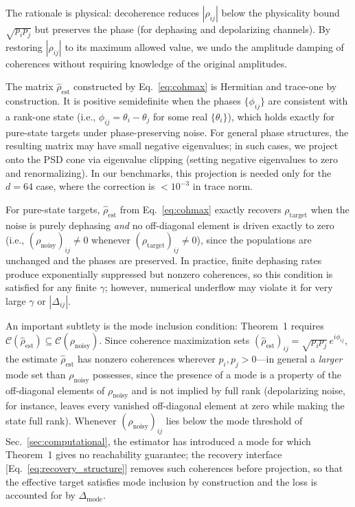 \documentclass[a4paper,onecolumn]{quantumarticle}
\newcommand{\CC}{\mathcal{C}}
\newcommand{\rhot}{\rho_\mathrm{target}}
\newcommand{\rhon}{\rho_\mathrm{noisy}}
\newcommand{\rhoe}{\hat{\rho}_\mathrm{est}}
\begin{document}
The rationale is physical: decoherence reduces $|\rho_{ij}|$ below the physicality bound $\sqrt{p_i p_j}$ but preserves the phase (for dephasing and depolarizing channels).
By restoring $|\rho_{ij}|$ to its maximum allowed value, we undo the amplitude damping of coherences without requiring knowledge of the original amplitudes.

The matrix $\rhoe$ constructed by Eq.~\eqref{eq:cohmax} is Hermitian and trace-one by construction.
It is positive semidefinite when the phases $\{\phi_{ij}\}$ are consistent with a rank-one state (i.e., $\phi_{ij} = \theta_i - \theta_j$ for some real $\{\theta_i\}$), which holds exactly for pure-state targets under phase-preserving noise.
For general phase structures, the resulting matrix may have small negative eigenvalues; in such cases, we project onto the PSD cone via eigenvalue clipping (setting negative eigenvalues to zero and renormalizing).
In our benchmarks, this projection is needed only for the $d = 64$ case, where the correction is $< 10^{-3}$ in trace norm.

For pure-state targets, $\rhoe$ from Eq.~\eqref{eq:cohmax} exactly recovers $\rhot$ when the noise is purely dephasing \emph{and} no off-diagonal element is driven exactly to zero (i.e., $(\rhon)_{ij} \neq 0$ whenever $(\rhot)_{ij} \neq 0$), since the populations are unchanged and the phases are preserved.
In practice, finite dephasing rates produce exponentially suppressed but nonzero coherences, so this condition is satisfied for any finite $\gamma$; however, numerical underflow may violate it for very large $\gamma$ or $|\Delta_{ij}|$.

An important subtlety is the mode inclusion condition: Theorem~1 requires $\CC(\rhoe) \subseteq \CC(\rhon)$.
Since coherence maximization sets $(\rhoe)_{ij} = \sqrt{p_i p_j}\,e^{i\phi_{ij}}$, the estimate $\rhoe$ has nonzero coherences wherever $p_i, p_j > 0$---in general a \emph{larger} mode set than $\rhon$ possesses, since the presence of a mode is a property of the off-diagonal elements of $\rhon$ and is not implied by full rank (depolarizing noise, for instance, leaves every vanished off-diagonal element at zero while making the state full rank).
Whenever $(\rhon)_{ij}$ lies below the mode threshold of Sec.~\ref{sec:computational}, the estimator has introduced a mode for which Theorem~1 gives no reachability guarantee; the recovery interface [Eq.~\eqref{eq:recovery_structure}] removes such coherences before projection, so that the effective target satisfies mode inclusion by construction and the loss is accounted for by $\Delta_\mathrm{mode}$.
\end{document}
